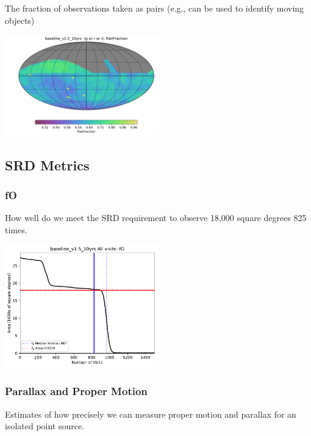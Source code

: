{The fraction of observations taken as pairs (e.g., can be used to identify moving objects)

\includegraphics[width=0.5\textwidth]{metric_summary/baseline_v1.5_10yrs/baseline_v1_5_10yrs_PairFraction_g_or_r_or_i_HEAL_SkyMap.pdf}

\subsection{SRD Metrics}

\subsubsection{fO}

How well do we meet the SRD requirement to observe 18,000 square degrees 825 times.

\includegraphics[width=0.5\textwidth]{metric_summary/baseline_v1.5_10yrs/baseline_v1_5_10yrs_fO_All_visits_HEAL_FO.pdf}


\subsubsection{Parallax and Proper Motion}

Estimates of how precisely we can measure proper motion and parallax for an isolated point source.

}
